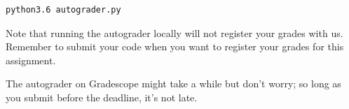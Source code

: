 \begin{verbatim}
python3.6 autograder.py
\end{verbatim}

Note that running the autograder locally will not register your grades with us. Remember to submit your code when you want to register your grades for this assignment.

The autograder on Gradescope might take a while but don't worry; so long as you submit before the deadline, it's not late.






